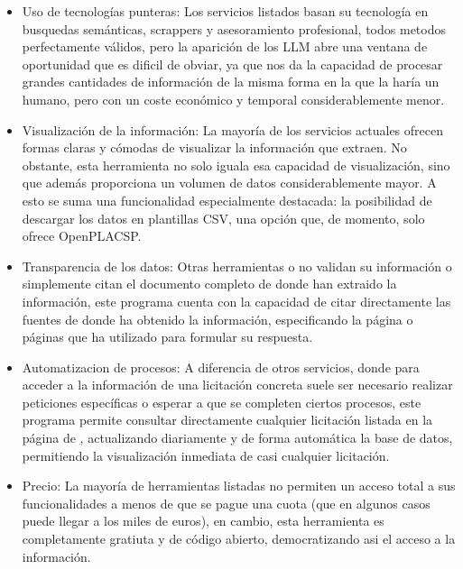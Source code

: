 \documentclass{article}
\begin{document}
\begin{itemize}
\item{Uso de tecnologías punteras:}
Los servicios listados basan su tecnología en busquedas semánticas, scrappers y asesoramiento profesional, todos metodos perfectamente válidos, pero la aparición de los LLM abre una ventana de oportunidad que es dificil de obviar, ya que nos da la capacidad de procesar grandes cantidades de información de la misma forma en la que la haría un humano, pero con un coste económico y temporal considerablemente menor. 

\item{Visualización de la información:}
La mayoría de los servicios actuales ofrecen formas claras y cómodas de visualizar la información que extraen. No obstante, esta herramienta no solo iguala esa capacidad de visualización, sino que además proporciona un volumen de datos considerablemente mayor. A esto se suma una funcionalidad especialmente destacada: la posibilidad de descargar los datos en plantillas CSV, una opción que, de momento, solo ofrece OpenPLACSP.

\item{Transparencia de los datos:}
Otras herramientas o no validan su información o simplemente citan el documento completo de donde han extraido la información, este programa cuenta con la capacidad de citar directamente las fuentes de donde ha obtenido la información, especificando la página o páginas que ha utilizado para formular su respuesta.

\item{Automatizacion de procesos:}
A diferencia de otros servicios, donde para acceder a la información de una licitación concreta suele ser necesario realizar peticiones específicas o esperar a que se completen ciertos procesos, este programa permite consultar directamente cualquier licitación listada en la página de \href{contratacionesdelestado.es}, actualizando diariamente y de forma automática la base de datos, permitiendo la visualización inmediata de casi cualquier licitación.

\item{Precio:}
La mayoría de herramientas listadas no permiten un acceso total a sus funcionalidades a menos de que se pague una cuota (que en algunos casos puede llegar a los miles de euros), en cambio, esta herramienta es completamente gratiuta y de código abierto, democratizando asi el acceso a la información.

\end{itemize}
\end{document}
